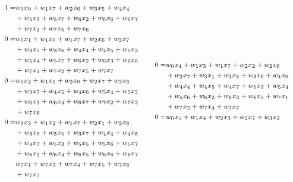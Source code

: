 \begin{equation*}
{\footnotesize \begin{split}
	1 =& w_{0} x_{0} + w_{1} x_{7} + w_{2} x_{6} + w_{3} x_{5} + w_{4} x_{4}\\
	&+w_{5} x_{3} + w_{5} x_{7} + w_{6} x_{2} + w_{6} x_{6} + w_{6} x_{7}\\
	&+w_{7} x_{1} + w_{7} x_{5} + w_{7} x_{6}\\
	0 =& w_{0} x_{1} + w_{1} x_{0} + w_{1} x_{7} + w_{2} x_{6} + w_{2} x_{7} \\
	&+w_{3} x_{5} + w_{3} x_{6} + w_{4} x_{4} + w_{4} x_{5} + w_{5} x_{3}\\
	&+w_{5} x_{4} + w_{5} x_{7} + w_{6} x_{2} + w_{6} x_{3} + w_{6} x_{6}\\
	&+w_{7} x_{1} + w_{7} x_{2} + w_{7} x_{5} + w_{7} x_{7}\\
	0 =& w_{0} x_{2} + w_{1} x_{1} + w_{2} x_{0} + w_{2} x_{7} + w_{3} x_{6} \\
	&+w_{3} x_{7} + w_{4} x_{5} + w_{4} x_{6} + w_{5} x_{4} + w_{5} x_{5}\\
	&+w_{6} x_{3} + w_{6} x_{4} + w_{6} x_{7} + w_{7} x_{2} + w_{7} x_{3}\\
	&+w_{7} x_{6}\\
	0 =& w_{0} x_{3} + w_{1} x_{2} + w_{1} x_{7} + w_{2} x_{1} + w_{2} x_{6} \\
	&+w_{3} x_{0} + w_{3} x_{5} + w_{3} x_{7} + w_{4} x_{4} + w_{4} x_{6}\\
	&+w_{4} x_{7} + w_{5} x_{3} + w_{5} x_{5} + w_{5} x_{6} + w_{5} x_{7}\\
	&+w_{6} x_{2} + w_{6} x_{4} + w_{6} x_{5} + w_{6} x_{6} + w_{6} x_{7}\\
	&w_{7} x_{1} + w_{7} x_{3} + w_{7} x_{4} + w_{7} x_{5} + w_{7} x_{6}\\
	&+ w_{7} x_{7}\\
	\end{split}}
\quad\quad
{\footnotesize\begin{split}
	0 =& w_{0} x_{4} + w_{1} x_{3} + w_{1} x_{7} + w_{2} x_{2} + w_{2} x_{6}\\
	&+w_{2} x_{7} + w_{3} x_{1} + w_{3} x_{5} + w_{3} x_{6} + w_{4} x_{0}\\
	&+w_{4} x_{4} + w_{4} x_{5} + w_{4} x_{7} + w_{5} x_{3} + w_{5} x_{4}\\
	&+w_{5} x_{6} + w_{6} x_{2} + w_{6} x_{3} + w_{6} x_{5} + w_{7} x_{1}\\
	&+w_{7} x_{2} + w_{7} x_{4} + w_{7} x_{7}\\
	0 =& w_{0} x_{5} + w_{1} x_{4} + w_{2} x_{3} + w_{2} x_{7} + w_{3} x_{2}\\

\end{split}}
\end{equation*}
